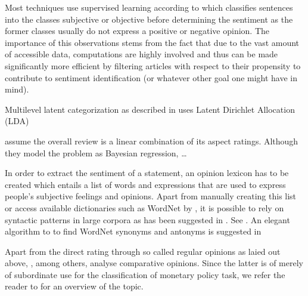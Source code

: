 Most techniques use supervised learning according to \textcite{Wiebe.1999} which classifies sentences into the classes subjective or objective before determining the sentiment as the former classes usually do not express a positive or negative opinion. The importance of this observations stems from the fact that due to the vast amount of accessible data, computations are highly involved and thus can be made significantly more efficient by filtering articles with respect to their propensity to contribute to sentiment identification (or whatever other goal one might have in mind). 


Multilevel latent categorization as described in \textcite{Guo.2009} uses Latent Dirichlet Allocation (LDA) 


\textcite{Wang.2010} assume the overall review is a linear combination of its aspect ratings. Although they model the problem as Bayesian regression, \dots %

In order to extract the sentiment of a statement, an opinion lexicon has to be created which entails a list of words and expressions that are used to express people's subjective feelings and opinions. Apart from manually creating this list or access available dictionaries such as WordNet\textsuperscript{\textregistered} by \textcite{Fellbaum.1998; Esuli.2006}, it is possible to rely on syntactic patterns in large corpora as has been suggested in \textcite{Ding.2008,Hatzivassiloglou.1997,Kanayama.2006,Turney.2002,Yu.2003}. See \textcite{Feldman.2013}. An elegant algorithm to to find WordNet\textsuperscript{\textregistered} synonyms and antonyms is suggested in \textcite{Kamps.2004} %

Apart from the direct rating through so called regular opinions as laied out above, \textcite{Ding.2009,Ganapathibhotla.2008,Jindal.2006}, among others, analyse comparative opinions. Since the latter is of merely of subordinate use for the classification of monetary policy task, we refer the reader to \textcite{Liu.2012} for an overview of the topic. 

